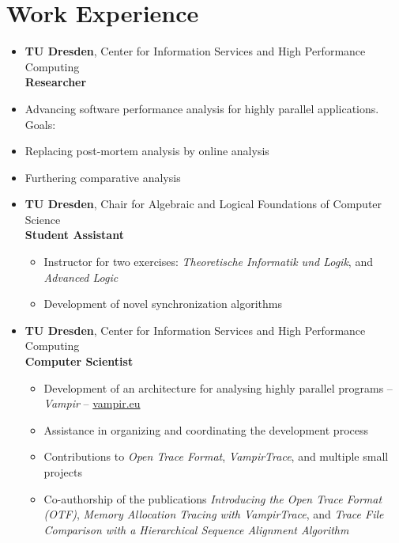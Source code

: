 



\pagestyle{empty}



\section*{Work Experience}
\begin{itemize}
	\item {}
		\textbf{TU Dresden}, Center for Information Services and High Performance Computing \\
		\textbf{Researcher}
		\item Advancing software performance analysis for highly parallel applications. Goals:
			\item \hspace{2em} Replacing post-mortem analysis by online analysis
			\item \hspace{2em} Furthering comparative analysis
	\item {}
		\textbf{TU Dresden}, Chair for Algebraic and Logical Foundations of Computer Science \\
		\textbf{Student Assistant}
		\begin{itemize}
			\item Instructor for two exercises: \textit{Theoretische Informatik und Logik}, and \textit{Advanced Logic}
			\item Development of novel synchronization algorithms
		\end{itemize}
	\item {}
		\textbf{TU Dresden}, Center for Information Services and High Performance Computing \\
		\textbf{Computer Scientist}
		\begin{itemize}
			\item Development of an architecture for analysing highly parallel programs -- \emph{Vampir} -- \href{http://www.vampir.eu}{vampir.eu}
			\item Assistance in organizing and coordinating the development process
			\item Contributions to \emph{Open Trace Format}, \emph{VampirTrace}, and multiple small projects
			\item Co-authorship of the publications \emph{Introducing the Open Trace Format (OTF)},
			\emph{Memory Allocation Tracing with VampirTrace}, and \emph{Trace File Comparison with a Hierarchical Sequence Alignment Algorithm}
		\end{itemize}
\end{itemize}

